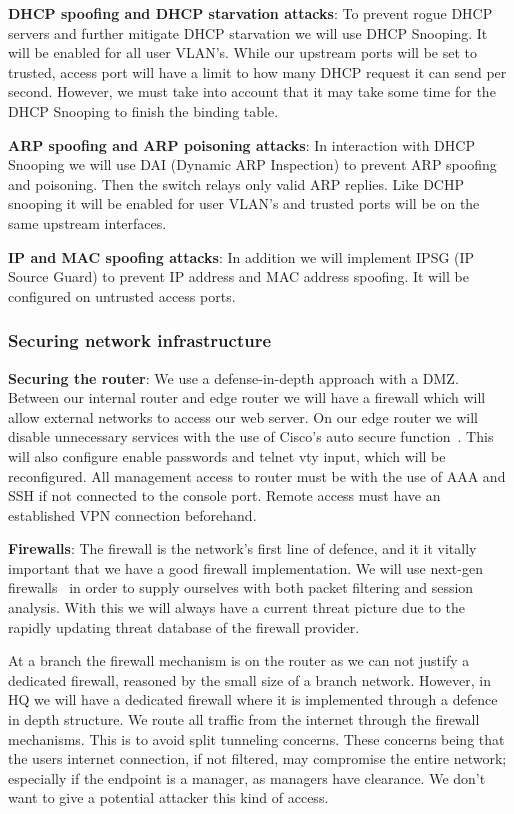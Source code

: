 \textbf{DHCP spoofing and DHCP starvation attacks}: To prevent rogue DHCP servers and further mitigate DHCP starvation we will use DHCP Snooping. It will be enabled for all user VLAN's. While our upstream ports will be set to trusted, access port will have a limit to how many DHCP request it can send per second. However, we must take into account that it may take some time for the DHCP Snooping to finish the binding table. 

\textbf{ARP spoofing and ARP poisoning attacks}: In interaction with DHCP Snooping we will use DAI (Dynamic ARP Inspection) to prevent ARP spoofing and poisoning. Then the switch relays only valid ARP replies. Like DCHP snooping it will be enabled for user VLAN's and trusted ports will be on the same upstream interfaces. 

\textbf{IP and MAC spoofing attacks}: In addition we will implement IPSG (IP Source Guard) to prevent IP address and MAC address spoofing. It will be configured on untrusted access ports.

\subsubsection{Securing network infrastructure}

\textbf{Securing the router}: We use a defense-in-depth approach with a DMZ. Between our internal router and edge router we will have a firewall which will allow external networks to access our web server. On our edge router we will disable unnecessary services with the use of Cisco's auto secure function~\cite{autosecure}. This will also configure enable passwords and telnet vty input, which will be reconfigured. All management access to router must be with the use of AAA and SSH if not connected to the console port. Remote access must have an established VPN connection beforehand.

\textbf{Firewalls}: The firewall is the network's first line of defence, and it it vitally important that we have a good firewall implementation. We will use next-gen firewalls~\cite{nextgenfirewall} in order to supply ourselves with both packet filtering and session analysis. With this we will always have a current threat picture due to the rapidly updating threat database of the firewall provider.

At a branch the firewall mechanism is on the router as we can not justify a dedicated firewall, reasoned by the small size of a branch network. However, in HQ we will have a dedicated firewall where it is implemented through a defence in depth structure. We route all traffic from the internet through the firewall mechanisms. This is to avoid split tunneling concerns. These concerns being that the users internet connection, if not filtered, may compromise the entire network; especially if the endpoint is a manager, as managers have clearance. We don't want to give a potential attacker this kind of access.

